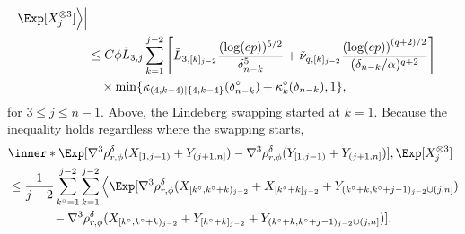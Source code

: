 \documentclass[aos]{imsart}
\begin{document}
\begin{appendix}
\begin{equation*}
\begin{aligned}
        \Exp[X_j^{\otimes 3}] 
    \Big\rangle \Big|\\
    & \leq C \phi \tilde L_{3,j} \sum_{k=1}^{j-2} \left[ \begin{aligned}
        \tilde L_{3,[k]_{j-2}} \frac{(\log(ep))^{5/2}}{\delta_{n-k}^5}
        + \tilde\nu_{q,[k]_{j-2}} \frac{ {(\log(ep))}^{(q+2)/2}}{(\delta_{n-k}/\alpha)^{q+2}}
    \end{aligned} \right] \\
    & \quad \times \min\{\kappa_{(4,k-4)|\{4,k-4\}}(\delta_{n-k}^\circ) + \kappa^\circ_{k}(\delta_{n-k}), 1\}, \\
\end{aligned}
\end{equation*}
for $3 \leq j \leq n-1$.
Above, the Lindeberg swapping started at $k = 1$. Because the inequality holds regardless where the swapping starts, 
\begin{equation*}
\begin{aligned}
    & \inner*{ 
        \Exp[\nabla^3 \rho_{r,\phi}^{\delta}(X_{[1,j-1)} + Y_{(j+1,n]})
        - \nabla^3 \rho_{r,\phi}^{\delta}(Y_{[1,j-1)} + Y_{(j+1,n]})], 
        \Exp[X_j^{\otimes 3}] } \\
    & \leq \frac{1}{j-2} \sum_{k^\circ=1}^{j-2} \sum_{k=1}^{j-2} \Big\langle
        \Exp[\nabla^3 \rho_{r,\phi}^{\delta}(X_{[k^\circ,k^\circ+k)_{j-2}} + X_{[k^\circ+k]_{j-2}} + Y_{(k^\circ+k,k^\circ+j-1)_{j-2}\cup(j,n]}) \\
    & \hspace{0.5in} - \nabla^3 \rho_{r,\phi}^{\delta}(X_{[k^\circ,k^\circ+k)_{j-2}} + Y_{[k^\circ+k]_{j-2}} + Y_{(k^\circ+k,k^\circ+j-1)_{j-2}\cup(j,n]})], 

\end{aligned}
\end{equation*}
\end{appendix}
\end{document}
